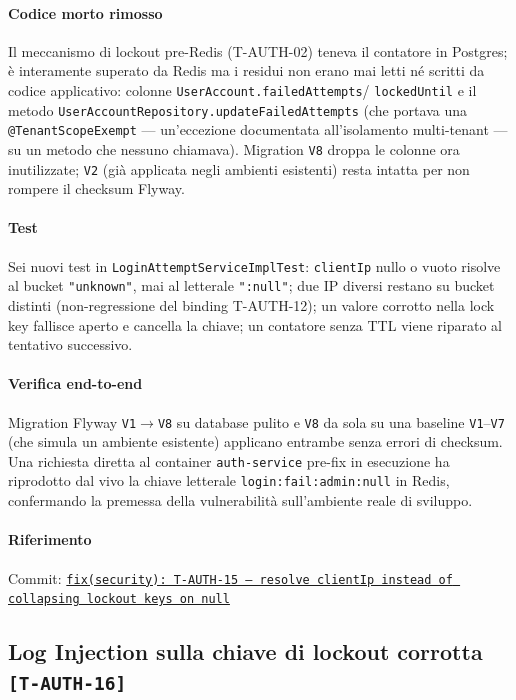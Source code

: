 ﻿\documentclass[a4paper,12pt]{report}
\newcommand{\commitref}[2]{\texttt{\small \href{https://github.com/diegoandruccioli/hotel-pms/commit/#1}{#2}}}
\newcommand{\threat}[1]{\texttt{\small\textcolor{vulnred}{[#1]}}}
\begin{document}
\paragraph{Codice morto rimosso}
Il meccanismo di lockout pre-Redis (T-AUTH-02) teneva il contatore in
Postgres; è interamente superato da Redis ma i residui non erano mai letti
né scritti da codice applicativo: colonne \texttt{UserAccount.failedAttempts}/
\texttt{lockedUntil} e il metodo \texttt{UserAccountRepository.updateFailedAttempts}
(che portava una \texttt{@TenantScopeExempt} --- un'eccezione documentata
all'isolamento multi-tenant --- su un metodo che nessuno chiamava).
Migration \texttt{V8} droppa le colonne ora inutilizzate; \texttt{V2}
(già applicata negli ambienti esistenti) resta intatta per non rompere il
checksum Flyway.

\paragraph{Test}
Sei nuovi test in \texttt{LoginAttemptServiceImplTest}:
\texttt{clientIp} nullo o vuoto risolve al bucket \texttt{"unknown"}, mai al
letterale \texttt{":null"}; due IP diversi restano su bucket distinti
(non-regressione del binding T-AUTH-12); un valore corrotto nella lock key
fallisce aperto e cancella la chiave; un contatore senza TTL viene riparato
al tentativo successivo.

\paragraph{Verifica end-to-end}
Migration Flyway \texttt{V1}$\to$\texttt{V8} su database pulito e
\texttt{V8} da sola su una baseline \texttt{V1}--\texttt{V7} (che simula un
ambiente esistente) applicano entrambe senza errori di checksum. Una
richiesta diretta al container \texttt{auth-service} pre-fix in esecuzione
ha riprodotto dal vivo la chiave letterale \texttt{login:fail:admin:null}
in Redis, confermando la premessa della vulnerabilità sull'ambiente reale
di sviluppo.

\paragraph{Riferimento} Commit: \commitref{1c24f72}{fix(security): T-AUTH-15 --- resolve clientIp instead of collapsing lockout keys on null}

\subsection{Log Injection sulla chiave di lockout corrotta \threat{T-AUTH-16}}
\end{document}
